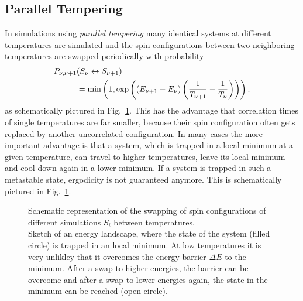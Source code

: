 \subsection{Parallel Tempering}
    In simulations using \emph{parallel tempering} \cite{ParallelTempering1986}
    many identical systems at different temperatures are simulated and
    the spin configurations between two neighboring temperatures are
    swapped periodically with probability \cite[p. 169ff]{NewmanBarkema1999} \cite[p. 155ff]{Katzgraber2011}
    \begin{align}
        \nonumber
        P_{\nu,\nu+1}&(S_\nu \leftrightarrow S_{\nu+1}) \\
        &= \min\left(1,\exp\left(\left(E_{\nu+1}-E_\nu\right)\left(\frac{1}{T_{\nu+1}}-\frac{1}{T_\nu}\right)\right)\right),
        \label{eq:partemp}
    \end{align}
    as schematically pictured in Fig.\ \ref{fig:parTemp}.
    This has the advantage that correlation times of single
    temperatures are far smaller, because their spin configuration
    often gets replaced by another uncorrelated configuration. In
    many cases the more important advantage is that a system, which
    is trapped in a local minimum at a given temperature, can travel
    to higher temperatures, leave its local minimum and cool down
    again in a lower minimum. If a system is trapped in such a
    metastable state, ergodicity is not guaranteed anymore.
    This is schematically pictured in Fig.\ \ref{fig:parTemp}.
    \begin{figure}[htbp]
        \centering
        \caption[Visualisation of the Parallel Tempering Algorithm]
        {
             Schematic representation of
            the swapping of spin configurations of different simulations \(S_i\)
            between temperatures.\\
             Sketch of an energy landscape, where
            the state of the system (filled circle) is trapped in an local
            minimum. At low temperatures it is very unlikley that it
            overcomes the energy barrier \(\Delta E\) to the minimum.
            After a swap to higher energies, the barrier can be overcome
            and after a swap to lower energies again, the state in
            the minimum can be reached (open circle).
        }
        \label{fig:parTemp}
    \end{figure}\\
